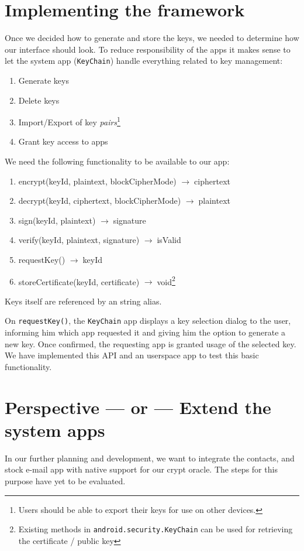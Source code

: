 \documentclass[a4paper]{scrartcl}
\newcommand{\totype}{\(\to\;\)}
\begin{document}
\section{Implementing the framework}
	Once we decided how to generate and store the keys, we needed to determine how our interface should look. To reduce responsibility of the apps it makes sense to let the system app (\texttt{KeyChain}) handle everything related to key management:
	\begin{enumerate}
		\item Generate keys
		\item Delete keys
		\item Import/Export of key \emph{pairs}\footnote{Users should be able to export their keys for use on other devices.}
		\item Grant key access to apps
	\end{enumerate}
	We need the following functionality to be available to our app:
	\begin{enumerate}
	\tt
		\item encrypt(keyId, plaintext, blockCipherMode) \totype ciphertext
		\item decrypt(keyId, ciphertext, blockCipherMode) \totype plaintext
		\item sign(keyId, plaintext) \totype signature
		\item verify(keyId, plaintext, signature) \totype isValid
		\item requestKey() \totype keyId
		\item storeCertificate(keyId, certificate) \totype void\footnote{Existing methods in \texttt{android.security.KeyChain} can be used for retrieving the certificate / public key}
	\end{enumerate}
	Keys itself are referenced by an string alias.

	On \texttt{requestKey()}, the \texttt{KeyChain} app displays a key selection dialog to the user, informing him which app requested it and giving him the option to generate a new key. Once confirmed, the requesting app is granted usage of the selected key.\\
	We have implemented this API and an userspace app to test this basic functionality.

\section{Perspective --- or --- Extend the system apps}
In our further planning and development, we want to integrate the contacts, and stock e-mail app with native support for our crypt oracle. The steps for this purpose have yet to be evaluated.
\end{document}
